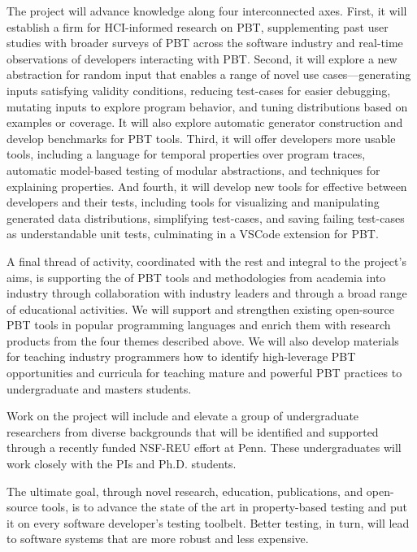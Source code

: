 The project will advance knowledge along four
interconnected axes.
%
First, it will establish a firm  for HCI-informed
research on PBT, supplementing past user studies with
broader surveys of PBT across the software industry and real-time
observations of developers interacting with PBT.
%
Second, it will explore a new abstraction for random input
 that enables a range of novel use
cases---generating inputs satisfying validity conditions, reducing
test-cases for easier debugging, mutating inputs to explore program
behavior, and tuning distributions based on examples or coverage. It
will also explore automatic generator construction and develop
benchmarks for PBT tools.
%
Third, it will offer developers more usable  tools,
including a language for temporal properties over program traces,
\iflater{}\fi
automatic model-based testing of
modular abstractions, and techniques for explaining properties.
%
And fourth, it will develop new tools for effective
 between developers and their tests, including
tools for visualizing and manipulating generated data
distributions, simplifying test-cases, and saving
  failing test-cases as understandable unit tests, culminating in a VSCode
  extension for PBT.  \iflater{}\fi

A final thread of activity, coordinated with the rest and integral to the
project's aims,
is supporting the  of PBT tools and
methodologies from academia into industry through collaboration with
industry leaders and through a broad range of educational activities.
We will support and strengthen existing
open-source PBT tools in popular programming languages and enrich them
with research products from the four
themes described above.
We will also
develop materials for teaching industry programmers how to identify
high-leverage PBT opportunities and curricula for teaching mature
and powerful PBT practices to undergraduate and masters students.

Work on the project will include and elevate a group of undergraduate
researchers from
diverse backgrounds that will be identified and supported through
a recently funded NSF-REU effort at Penn. These
undergraduates will work closely with the PIs and Ph.D.{} students.

The ultimate goal, through novel research, education, publications, and open-source
tools, is to advance the state of the art in property-based testing
and put it on every
software developer's testing toolbelt.  Better testing, in turn, will
lead to software systems that are more robust and less expensive.


